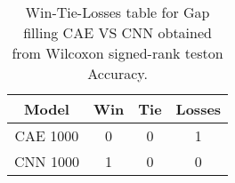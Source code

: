 \begin{table}[H]
\centering
\begin{tabular}{|c|c|c|c|}

\textbf{Model} &  \textbf{Win} &  \textbf{Tie} &  \textbf{Losses} \\
\hline

      CAE 1000 &             0 &             0 &                1 \\
\hline
      CNN 1000 &             1 &             0 &                0 \\
\hline

\end{tabular}
\caption{Win-Tie-Losses table for Gap filling CAE VS CNN obtained from Wilcoxon signed-rank teston Accuracy.}
\label{tab:gap_filling_cae_vs_cnn_model_comparison}
\end{table}